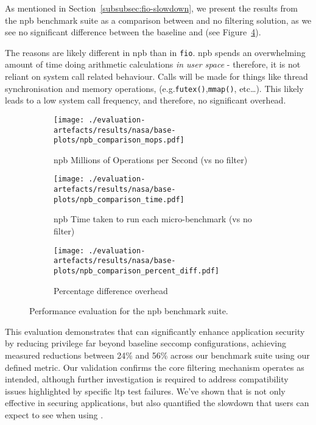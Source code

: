 As mentioned in Section~\ref{subsubsec:fio-slowdown}, we present the results
from the \ac{npb} benchmark suite as a comparison between \af and no filtering
solution, as we see no significant difference between the baseline and \af (see
Figure~\ref{fig:npb-perf}).

The reasons are likely different in \ac{npb} than in \texttt{fio}. \ac{npb}
spends an overwhelming amount of time doing arithmetic calculations \textit{in
user space} - therefore, it is not reliant on system call related behaviour.
Calls will be made for things like thread synchronisation and memory 
operations, (e.g.\texttt{futex()},{}\texttt{mmap()}, etc\dots). This likely
leads to a low system call frequency, and therefore, no significant overhead.

\begin{figure}[htbp]
    \centering
    \begin{subfigure}[b]{0.7 \textwidth}
        \centering
        \texttt{[image: ./evaluation-artefacts/results/nasa/base-plots/npb\_comparison\_mops.pdf]} 
        \caption{\ac{npb} Millions of Operations per Second (\af vs no filter)}
        \label{fig:npb-mops}
    \end{subfigure}
    \hfill
     \begin{subfigure}[b]{0.7 \textwidth}
        \centering
        \texttt{[image: ./evaluation-artefacts/results/nasa/base-plots/npb\_comparison\_time.pdf]} 
        \caption{\ac{npb} Time taken to run each micro-benchmark (\af vs no
        filter)}
        \label{fig:npb-time}
    \end{subfigure}
     \medskip 
     \begin{subfigure}[b]{0.7 \textwidth}
        \centering
        \texttt{[image: ./evaluation-artefacts/results/nasa/base-plots/npb\_comparison\_percent\_diff.pdf]} %
        \caption{Percentage difference overhead}
        \label{fig:npb-percdiff}
    \end{subfigure}

    \caption{Performance evaluation for the \ac{npb} benchmark suite.}
    \label{fig:npb-perf}
\end{figure}

This evaluation demonstrates that \af can significantly enhance
application security by reducing privilege far beyond baseline seccomp
configurations, achieving measured reductions between 24\% and 56\% across
our benchmark suite using our defined metric. Our validation
confirms the core filtering mechanism operates as intended, although further
investigation is required to address compatibility issues highlighted by
specific \ac{ltp} test failures. We've shown that \af is not only effective
in securing applications, but also quantified the slowdown that users can 
expect to see when using \af.

